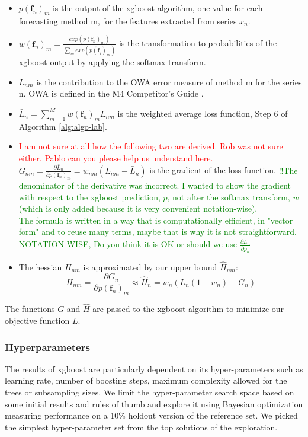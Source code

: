 \documentclass[11pt,a4paper,]{article}
\providecommand{\tightlist}{%
  \setlength{\itemsep}{0pt}\setlength{\parskip}{0pt}}
\theoremstyle{definition}
\theoremstyle{definition}
\theoremstyle{definition}
\theoremstyle{remark}
\begin{document}
\begin{itemize}
\tightlist
\item
  \(p(\bm{f}_n)_m\) is the output of the xgboost algorithm, one value
  for each forecasting method m, for the features extracted from series
  \(x_n\).
\item
  \(w(\bm{f}_n)_{m} = \frac{exp(p(\bm{f}_n)_m)}{ \sum_m exp(p(\bm{f}_j)_m)}\)
  is the transformation to probabilities of the xgboost output by
  applying the softmax transform.
\item
  \(L_{nm}\) is the contribution to the OWA error measure of method m
  for the series n. OWA is defined in the M4 Competitor's Guide
  \textcite{M4compguide}.
\item
  \(\bar{L}_n = \sum_{m=1}^M w(\bm{f}_n)_m L_{nm}\) is the weighted
  average loss function, Step 6 of Algorithm \ref{alg:algo-lab}.
\item
  \textcolor{red}{I am not sure at all how the following two are derived. Rob was not sure either. Pablo can you please help us understand here.}
  \(G_{nm} = \frac{\partial{\bar{L}_n}}{\partial{p(\bm{f}_n)_m}} = w_{nm}(L_{nm} - \bar{L}_n)\)
  is the gradient of the loss function.
  \textcolor{green}{!!The denominator of the derivative was incorrect. I wanted to show the gradient with respect to the xgboost prediction, $p$, not after the softmax transform, $w$ (which is only added because it is very convenient notation-wise).
    \\The formula is written in a way that is computationally efficient, in "vector form" and to reuse many terms, maybe that is why it is not straightforward.
    \\ NOTATION WISE, Do you think it is OK or should we use
    $\frac{\partial{\bar{L}_n}}{\partial{p_n}}$}
\item
  The hessian \(H_{nm}\) is approximated by our upper bound
  \(\hat{H}_{nm}\):
  \[ H_{nm} = \frac{\partial{G_n}}{\partial{p(\bm{f}_n)_m}} \approx \hat{H}_n = w_n(L_n(1-w_n) - G_n)  \]
\end{itemize}

The functions \(G\) and \(\hat{H}\) are passed to the xgboost algorithm
to minimize our objective function \(L\).

\subsubsection{Hyperparameters}\label{hyperparameters}

The results of xgboost are particularly dependent on its
hyper-parameters such as learning rate, number of boosting steps,
maximum complexity allowed for the trees or subsampling sizes. We limit
the hyper-parameter search space based on some initial results and rules
of thumb and explore it using Bayesian optimization
\autocite[implemented in the \texttt{rBayesianOptimization} R
package][]{rBayesianOptimization} measuring performance on a 10\%
holdout version of the reference set. We picked the simplest
hyper-parameter set from the top solutions of the exploration.
\end{document}
